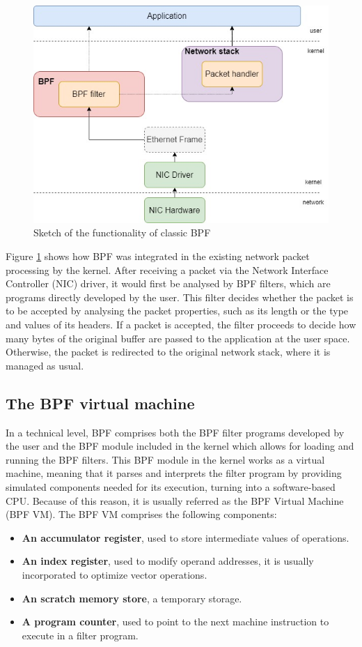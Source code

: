 \documentclass[12pt]{report} %
\begin{document}
\begin{figure}[H]
	\centering
	\includegraphics[width=12cm, keepaspectratio=true]{classic_bpf.jpg}
	\caption{Sketch of the functionality of classic BPF}
	\label{fig:classif_bpf}
\end{figure}

Figure \ref{fig:classif_bpf} shows how BPF was integrated in the existing network packet processing by the kernel. After receiving a packet via the Network Interface Controller (NIC) driver, it would first be analysed by BPF filters, which are programs directly developed by the user. This filter decides whether the packet is to be accepted by analysing the packet properties, such as its length or the type and values of its headers. If a packet is accepted, the filter proceeds to decide how many bytes of the original buffer are passed to the application at the user space. Otherwise, the packet is redirected to the original network stack, where it is managed as usual.


\subsection{The BPF virtual machine} \label{subsection:bpf_vm}
In a technical level, BPF comprises both the BPF filter programs developed by the user and the BPF module included in the kernel which allows for loading and running the BPF filters. This BPF module in the kernel works as a virtual machine\cite{bpf_bsd_origin_bpf_page1}, meaning that it parses and interprets the filter program by providing simulated components needed for its execution, turning into a software-based CPU. Because of this reason, it is usually referred as the BPF Virtual Machine (BPF VM). The BPF VM comprises the following components:
\begin{itemize}
\item \textbf{An accumulator register}, used to store intermediate values of operations.
\item \textbf{An index register}, used to modify operand addresses, it is usually incorporated to optimize vector operations\cite{index_register}.
\item \textbf{An scratch memory store}, a temporary storage.
\item \textbf{A program counter}, used to point to the next machine instruction to execute in a filter program.
\end{itemize}
\end{document}
